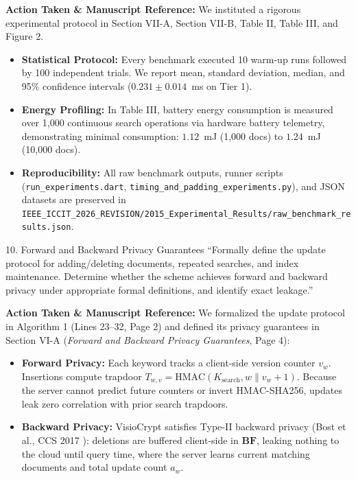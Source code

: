 \documentclass[11pt,a4paper]{article}
\begin{document}
\begin{responsebox}
\textbf{Action Taken \& Manuscript Reference:} We instituted a rigorous experimental protocol in Section VII-A, Section VII-B, Table II, Table III, and Figure 2.
\begin{itemize}[itemsep=2pt]
    \item \textbf{Statistical Protocol:} Every benchmark executed 10 warm-up runs followed by 100 independent trials. We report mean, standard deviation, median, and 95\% confidence intervals ($0.231 \pm 0.014$~ms on Tier 1).
    \item \textbf{Energy Profiling:} In Table III, battery energy consumption is measured over 1,000 continuous search operations via hardware battery telemetry, demonstrating minimal consumption: $1.12$~mJ (1,000 docs) to $1.24$~mJ (10,000 docs).
    \item \textbf{Reproducibility:} All raw benchmark outputs, runner scripts (\texttt{run\_experiments.dart}, \texttt{timing\_and\_padding\_experiments.py}), and JSON datasets are preserved in \texttt{IEEE\_ICCIT\_2026\_REVISION/2015\_Experimental\_Results/raw\_benchmark\_results.json}.
\end{itemize}
\end{responsebox}

\vspace{1em}

\begin{reviewbox}{10. Forward and Backward Privacy Guarantees}
``Formally define the update protocol for adding/deleting documents, repeated searches, and index maintenance. Determine whether the scheme achieves forward and backward privacy under appropriate formal definitions, and identify exact leakage.''
\end{reviewbox}

\begin{responsebox}
\textbf{Action Taken \& Manuscript Reference:} We formalized the update protocol in Algorithm 1 (Lines 23--32, Page 2) and defined its privacy guarantees in Section VI-A (\emph{Forward and Backward Privacy Guarantees}, Page 4):
\begin{itemize}[itemsep=2pt]
    \item \textbf{Forward Privacy:} Each keyword tracks a client-side version counter $v_w$. Insertions compute trapdoor $T_{w,v} = \text{HMAC}(K_{\text{search}}, w \parallel v_w + 1)$. Because the server cannot predict future counters or invert HMAC-SHA256, updates leak zero correlation with prior search trapdoors.
    \item \textbf{Backward Privacy:} VisioCrypt satisfies Type-II backward privacy (Bost et al., CCS 2017 \cite{bost2017diana}): deletions are buffered client-side in $\mathbf{BF}$, leaking nothing to the cloud until query time, where the server learns current matching documents and total update count $a_w$.
\end{itemize}
\end{responsebox}
\end{document}
